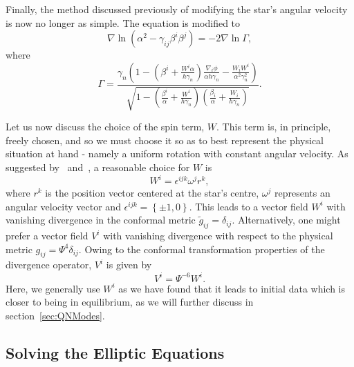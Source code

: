 Finally, the method discussed previously of modifying the star's
angular velocity is now no longer as simple. The equation is modified
to
 \begin{equation}
\nabla\ln\left(\alpha^2-\gamma_{ij}\beta^{i}\beta^{j}\right)=-2\nabla\ln\Gamma,
\end{equation}
where
\begin{equation}
\Gamma
=\frac{\gamma_n\left(1-\left(\beta^i+\frac{W^i\alpha}{h\gamma_n}\right)\frac{\nabla_i\phi}{\alpha
    h\gamma_n}- \frac{W_i W^i}{\alpha^2\gamma_n^2}\right) } { \sqrt{ 1
    - \left(\frac{\beta^i}{\alpha}+\frac{W^i}{h\gamma_n}\right)
    \left(\frac{\beta_i}{\alpha}+\frac{W_i}{h\gamma_n}\right) } }.
\end{equation}

Let us now discuss the choice of the spin term, $W$. This term is, in
principle, freely chosen, and so we must choose it so as to best
represent the physical situation at hand - namely a uniform rotation
with constant angular velocity. As suggested by~\cite{Tichy:2011gw} and~\cite{Tichy:2012rp}, a reasonable choice for $W$ is 
\begin{equation}
\label{eq:UniformRotation}
W^i = \epsilon^{ijk}\omega^{j}r^k,
\end{equation}
where $r^k$ is the position vector centered at the star's centre,
$\omega^j$ represents an angular velocity vector and $\epsilon^{ijk}=\left\{\pm 1,0\right\}$. This leads to a vector field $W^i$ with vanishing divergence in the conformal metric $\tilde{g}_{ij}=\delta_{ij}$. Alternatively, one might prefer a vector field $V^i$ with vanishing divergence with respect to the physical metric $g_{ij}=\Psi^4\delta_{ij}$. Owing to the conformal transformation properties of the divergence operator, $V^i$ is given by
\begin{equation}
\label{eq:ConformalUniformRotation}
V^i=\Psi^{-6}W^i.
\end{equation}
Here, we generally use $W^i$ as we have found that it leads to initial data which is closer to being in equilibrium, as we will further discuss in section~\ref{sec:QNModes}.


\subsection{Solving the Elliptic Equations}



